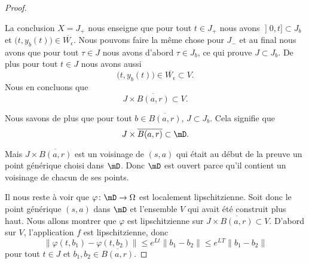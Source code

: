 \begin{proof}
\begin{subproof}
	\end{subproof}

	La conclusion \( X=J_+\) nous enseigne que pour tout \( t\in J_+\) nous avons \( \mathopen] 0 , t \mathclose]\subset J_b\) et \( \big( t,y_b(t) \big)\in \overline{ W_{\epsilon} }\). Nous pouvons faire la même chose pour \( J_-\) et au final nous avons que pour tout \( \tau\in J\) nous avons d'abord \( \tau\in J_b\), ce qui prouve \( J\subset J_b\). De plus pour tout \( t\in J\) nous avons aussi
	\begin{equation}
		\big( t,y_b(t) \big)\in\overline{ W_{\epsilon} }\subset V.
	\end{equation}
	Nous en concluons que
	\begin{equation}
		J\times \overline{ B(a,r) }\subset V.
	\end{equation}

	Nous savons de plus que pour tout \( b\in \overline{ B(a,r) }\), \( J\subset J_b\). Cela signifie que
	\begin{equation}
		J\times \overline{ B(a,r) }\subset \mD.
	\end{equation}

	Mais \( J\times \overline{ B(a,r) }\) est un voisinage de \( (s,a)\) qui était au début de la preuve un point générique choisi dans \( \mD\). Donc \( \mD\) est ouvert parce qu'il contient un voisinage de chacun de ses points.

	Il nous reste à voir que \( \varphi\colon \mD\to \Omega\) est localement lipschitzienne. Soit donc le point générique \( (s,a)\) dans \( \mD\) et l'ensemble \( V\) qui avait été construit plus haut. Nous allons montrer que \( \varphi\) est lipschitzienne sur \( J\times \overline{ B(a,r) }\subset V\). D'abord sur \( V\), l'application \( f\) est lipschitzienne, donc
	\begin{equation}
		\| \varphi(t,b_1)-\varphi(t,b_2) \|\leq  e^{Lt}\| b_1-b_2 \|
		\leq  e^{LT}\| b_1-b_2 \|
	\end{equation}
	pour tout \( t\in J\) et \( b_1,b_2\in \overline{ B(a,r) }\).


\end{proof}
